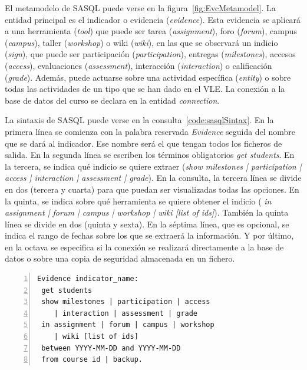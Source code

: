 			El metamodelo de SASQL puede verse en la figura~\ref{fig:EvcMetamodel}. La entidad principal es el indicador o evidencia (\emph{evidence}). Esta evidencia se aplicará a una herramienta (\emph{tool}) que puede ser tarea (\emph{assignment}), foro (\emph{forum}), campus (\emph{campus}), taller (\emph{workshop}) o wiki (\emph{wiki}), en las que se observará un indicio (\emph{sign}), que puede ser participación (\emph{participation}), entregas (\emph{milestones}), accesos (\emph{access}), evaluaciones (\emph{assessment}), interacción (\emph{interaction}) o calificación (\emph{grade}). Además, puede actuarse sobre una actividad específica (\emph{entity}) o sobre todas las actividades de un tipo que se han dado en el VLE. La conexión a la base de datos del curso se declara en la entidad \emph{connection}. 

			La sintaxis de SASQL puede verse en la consulta~\ref{code:sasqlSintax}. En la primera línea se comienza con la palabra reservada \emph{Evidence} seguida del nombre que se dará al indicador. Ese nombre será el que tengan todos los ficheros de salida. En la segunda línea se escriben los términos obligatorios \emph{get students}. En la tercera, se indica qué indicio se quiere extraer (\emph{show milestones | participation | access | interaction | assessment | grade}). En la consulta, la tercera línea se divide en dos (tercera y cuarta) para que puedan ser visualizadas todas las opciones. En la quinta, se indica sobre qué herramienta se quiere obtener el indicio (\emph{ in assignment | forum | campus | workshop | wiki [list of ids]}). También la quinta línea se divide en dos (quinta y sexta). En la séptima línea, que es opcional, se indica el rango de fechas sobre los que se extraerá la información. Y por último, en la octava se especifica si la conexión se realizará directamente a la base de datos o sobre una copia de seguridad almacenada en un fichero.

\begin{lstlisting}[caption=Sintaxis de SASQL (las palabras reservadas se muestran resaltadas),label=code:sasqlSintax,numbers=left, captionpos=b, morekeywords={Evidence,get, students, show, milestones, participation, access, in, assignment, forum, campus, wiki, between, and, workshop, interaction, assessment, grade, from, course, backup}]
Evidence indicator_name:
 get students 
 show milestones | participation | access 
	| interaction | assessment | grade
 in assignment | forum | campus | workshop 
	| wiki [list of ids]
 between YYYY-MM-DD and YYYY-MM-DD
 from course id | backup.
\end{lstlisting}


